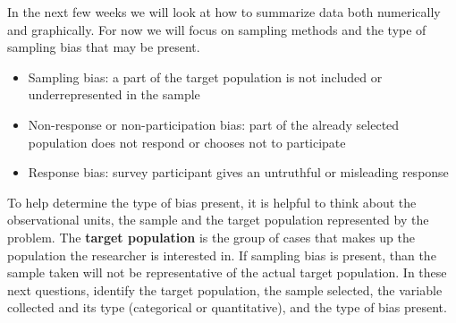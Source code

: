 \documentclass[
]{report}
\begin{document}
In the next few weeks we will look at how to summarize data both numerically and graphically. For now we will focus on sampling methods and the type of sampling bias that may be present.

\begin{itemize}
\item
  Sampling bias: a part of the target population is not included or underrepresented in the sample
\item
  Non-response or non-participation bias: part of the already selected population does not respond or chooses not to participate
\item
  Response bias: survey participant gives an untruthful or misleading response
\end{itemize}

To help determine the type of bias present, it is helpful to think about the observational units, the sample and the target population represented by the problem. The \textbf{target population} is the group of cases that makes up the population the researcher is interested in. If sampling bias is present, than the sample taken will not be representative of the actual target population. In these next questions, identify the target population, the sample selected, the variable collected and its type (categorical or quantitative), and the type of bias present.
\end{document}
